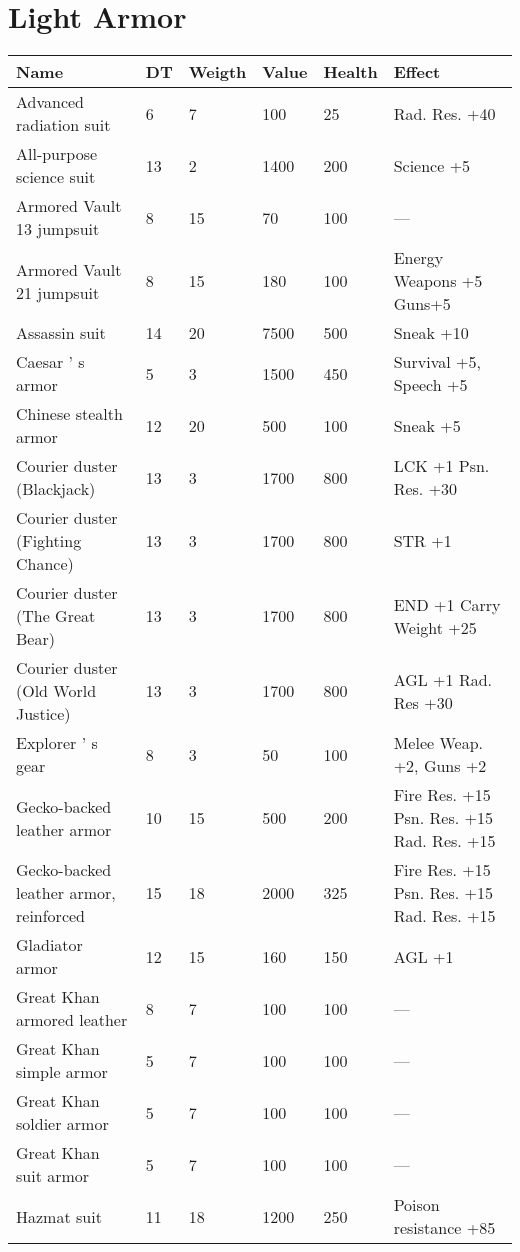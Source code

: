 \documentclass{report}
\begin{document}
\begin{table}[H]
\begin{table}[H]
\begin{table}[H]
\begin{table}[H]
\begin{table}[H]
\begin{table}[H]
\begin{table}[H]
\begin{table}[H]
\begin{table}[H]
\begin{table}[H]
\begin{table}[H]
\begin{table}[H]
\begin{table}[H]
\begin{table}[H]
\begin{table}[H]
\begin{table}[H]
\begin{table}[H]
\begin{table}[H]
\chapter{Light Armor}
\begin{table}[H]
  \centering
  \begin{tabular}{p{30mm}p{30mm}p{30mm}p{30mm}p{30mm}p{30mm}}
\bfseries Name & \bfseries DT & \bfseries Weigth & \bfseries Value & \bfseries Health & \bfseries Effect \\
\hline
Advanced radiation suit  & 6 & 7 & 100 & 25 & Rad. Res. +40  \\
All-purpose science suit  & 13 & 2 & 1400 & 200 & Science +5  \\
Armored Vault 13 jumpsuit  & 8 & 15 & 70 & 100 & —  \\
Armored Vault 21 jumpsuit  & 8 & 15 & 180 & 100 & Energy Weapons +5 Guns+5  \\
Assassin suit  & 14 & 20 & 7500 & 500 & Sneak +10  \\
Caesar ' s armor  & 5 & 3 & 1500 & 450 & Survival +5, Speech +5  \\
Chinese stealth armor  & 12 & 20 & 500 & 100 & Sneak +5  \\
Courier duster (Blackjack)  & 13 & 3 & 1700 & 800 & LCK +1 Psn. Res. +30  \\
Courier duster (Fighting Chance)  & 13 & 3 & 1700 & 800 & STR +1  \\
Courier duster (The Great Bear)  & 13 & 3 & 1700 & 800 & END +1 Carry Weight +25  \\
Courier duster (Old World Justice)  & 13 & 3 & 1700 & 800 & AGL +1 Rad. Res +30  \\
Explorer ' s gear  & 8 & 3 & 50 & 100 & Melee Weap. +2, Guns +2  \\
Gecko-backed leather armor  & 10 & 15 & 500 & 200 & Fire Res. +15 Psn. Res. +15 Rad. Res. +15  \\
Gecko-backed leather armor, reinforced  & 15 & 18 & 2000 & 325 & Fire Res. +15 Psn. Res. +15 Rad. Res. +15  \\
Gladiator armor  & 12 & 15 & 160 & 150 & AGL +1  \\
Great Khan armored leather  & 8 & 7 & 100 & 100 & —  \\
Great Khan simple armor  & 5 & 7 & 100 & 100 & —  \\
Great Khan soldier armor  & 5 & 7 & 100 & 100 & —  \\
Great Khan suit armor  & 5 & 7 & 100 & 100 & —  \\
Hazmat suit  & 11 & 18 & 1200 & 250 & Poison resistance +85  \\

\end{tabular}
\end{table}
\end{table}
\end{table}
\end{table}
\end{table}
\end{table}
\end{table}
\end{table}
\end{table}
\end{table}
\end{table}
\end{table}
\end{table}
\end{table}
\end{table}
\end{table}
\end{table}
\end{table}
\end{table}
\end{document}
